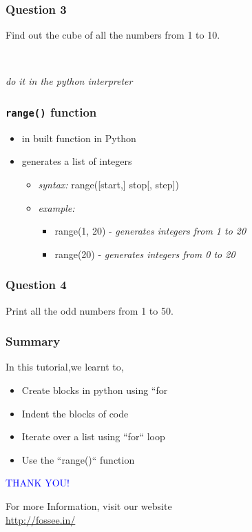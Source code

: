 \documentclass[presentation]{beamer}
\begin{document}
\begin{frame}[fragile]
\frametitle{Question 3}
\label{sec-8}

  Find out the cube of all the numbers from 1 to 10.
\begin{verbatim}
   
\end{verbatim}

  \emph{do it in the python interpreter}
\end{frame}
\begin{frame}
\frametitle{\verb~range()~ function}
\label{sec-9}


\begin{itemize}
\item in built function in Python
\item generates a list of integers
\begin{itemize}
\item \emph{syntax:} range([start,] stop[, step])
\item \emph{example:}
\begin{itemize}
\item range(1, 20) - \emph{generates integers from 1 to 20}
\item range(20) - \emph{generates integers from 0 to 20}
\end{itemize}
\end{itemize}
\end{itemize}
\end{frame}
\begin{frame}
\frametitle{Question 4}
\label{sec-10}

  Print all the odd numbers from 1 to 50.
\end{frame}
\begin{frame}
\frametitle{Summary}
\label{sec-11}

  In this tutorial,we learnt to,

\begin{itemize}
\item Create blocks in python using ``for
\item Indent the blocks of code
\item Iterate over a list using ``for`` loop
\item Use the ``range()`` function
\end{itemize}
\end{frame}
\begin{frame}

  \begin{block}{}
  \begin{center}
  \textcolor{blue}{\Large THANK YOU!} 
  \end{center}
  \end{block}
\begin{block}{}
  \begin{center}
    For more Information, visit our website\\
    \url{http://fossee.in/}
  \end{center}  
  \end{block}
\end{frame}
\end{document}
